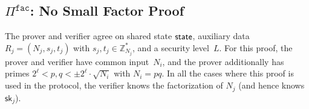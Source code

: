 \documentclass[11pt]{article}
\newcommand{\jnote}[1]{{\textcolor{blue}{Jon's note: #1}}}
\newcommand{\nnote}[1]{{\textcolor{purple}{Mikito: #1}}}
\def\state{{\sf state}}
\newcommand{\proof}[1]{\ensuremath{\Pi^{\mathtt{#1}}}}
\newcommand{\sk}{\textsf{sk}}
\newcommand{\?}[1]{\stackrel{?}{#1}}
\begin{document}
\subsection{$\proof{fac}$: No Small Factor Proof}
The prover and verifier agree on shared state $\state$, auxiliary data $R_j=(N_j, s_j, t_j)$ with $s_j, t_j \in {\mathbb Z}_{N_j}^*$, and a security level~$L$. 
For this proof, the prover and verifier have common input~$N_i$, and the prover additionally has primes $2^\ell < p, q < \pm 2^\ell \cdot \sqrt{N_i}$ with $N_i=pq$. 
In all the cases where this proof is used in the protocol, the verifier knows the factorization of $N_j$ (and hence knows~$\sk_j$).

\end{document}
